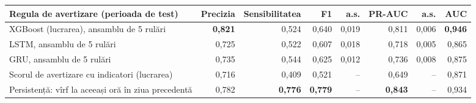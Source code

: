 \begin{tabular}{lrrrrrrr}
\toprule
Regula de avertizare (perioada de test) & Precizia & Sensibilitatea & F1 & a.s. & PR-AUC & a.s. & AUC \\
\midrule
XGBoost (lucrarea), ansamblu de 5 rulări & \textbf{0,821} & 0,524 & 0,640 & 0,019 & 0,811 & 0,006 & \textbf{0,946} \\
LSTM, ansamblu de 5 rulări & 0,725 & 0,522 & 0,607 & 0,018 & 0,718 & 0,005 & 0,865 \\
GRU, ansamblu de 5 rulări & 0,735 & 0,544 & 0,625 & 0,012 & 0,736 & 0,008 & 0,875 \\
Scorul de avertizare cu indicatori (lucrarea) & 0,716 & 0,409 & 0,521 & -- & 0,649 & -- & 0,871 \\
Persistență: vîrf la aceeași oră în ziua precedentă & 0,782 & \textbf{0,776} & \textbf{0,779} & -- & \textbf{0,843} & -- & 0,934 \\
\bottomrule
\end{tabular}
